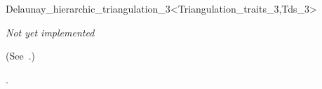 

\begin{ccRefClass}{Delaunay_hierarchic_triangulation_3<Triangulation_traits_3,Tds_3>}  %


\textit{Not yet implemented}

\ccDefinition

(See~\cite{d-iirdt-98}.)










\ccSeeAlso

.





\end{ccRefClass}


